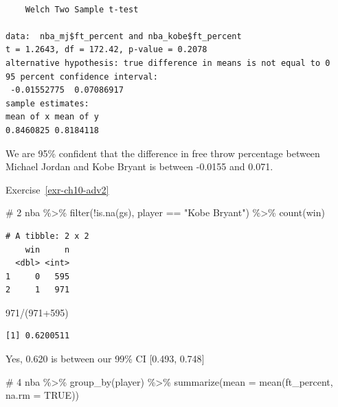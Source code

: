 \documentclass[
  letterpaper,
  DIV=11,
  numbers=noendperiod]{scrreprt}
\newenvironment{Shaded}{\begin{snugshade}}{\end{snugshade}}
\newcommand{\AttributeTok}[1]{\textcolor[rgb]{0.40,0.45,0.13}{#1}}
\newcommand{\CommentTok}[1]{\textcolor[rgb]{0.37,0.37,0.37}{#1}}
\newcommand{\ConstantTok}[1]{\textcolor[rgb]{0.56,0.35,0.01}{#1}}
\newcommand{\DecValTok}[1]{\textcolor[rgb]{0.68,0.00,0.00}{#1}}
\newcommand{\FunctionTok}[1]{\textcolor[rgb]{0.28,0.35,0.67}{#1}}
\newcommand{\NormalTok}[1]{\textcolor[rgb]{0.00,0.23,0.31}{#1}}
\newcommand{\SpecialCharTok}[1]{\textcolor[rgb]{0.37,0.37,0.37}{#1}}
\newcommand{\StringTok}[1]{\textcolor[rgb]{0.13,0.47,0.30}{#1}}
\theoremstyle{definition}
\theoremstyle{remark}
\begin{document}
\begin{verbatim}

    Welch Two Sample t-test

data:  nba_mj$ft_percent and nba_kobe$ft_percent
t = 1.2643, df = 172.42, p-value = 0.2078
alternative hypothesis: true difference in means is not equal to 0
95 percent confidence interval:
 -0.01552775  0.07086917
sample estimates:
mean of x mean of y 
0.8460825 0.8184118 
\end{verbatim}

We are 95\% confident that the difference in free throw percentage
between Michael Jordan and Kobe Bryant is between -0.0155 and 0.071.

Exercise~\ref{exr-ch10-adv2}

\begin{Shaded}
\begin{Highlighting}[]
\CommentTok{\# 2}
\NormalTok{nba }\SpecialCharTok{\%\textgreater{}\%} 
  \FunctionTok{filter}\NormalTok{(}\SpecialCharTok{!}\FunctionTok{is.na}\NormalTok{(gs), player }\SpecialCharTok{==} \StringTok{"Kobe Bryant"}\NormalTok{) }\SpecialCharTok{\%\textgreater{}\%} 
  \FunctionTok{count}\NormalTok{(win)}
\end{Highlighting}
\end{Shaded}

\begin{verbatim}
# A tibble: 2 x 2
    win     n
  <dbl> <int>
1     0   595
2     1   971
\end{verbatim}

\begin{Shaded}
\begin{Highlighting}[]
\DecValTok{971}\SpecialCharTok{/}\NormalTok{(}\DecValTok{971}\SpecialCharTok{+}\DecValTok{595}\NormalTok{)}
\end{Highlighting}
\end{Shaded}

\begin{verbatim}
[1] 0.6200511
\end{verbatim}

Yes, 0.620 is between our 99\% CI {[}0.493, 0.748{]}

\begin{Shaded}
\begin{Highlighting}[]
\CommentTok{\# 4}
\NormalTok{nba }\SpecialCharTok{\%\textgreater{}\%} 
  \FunctionTok{group\_by}\NormalTok{(player) }\SpecialCharTok{\%\textgreater{}\%} 
  \FunctionTok{summarize}\NormalTok{(}\AttributeTok{mean =} \FunctionTok{mean}\NormalTok{(ft\_percent, }\AttributeTok{na.rm =} \ConstantTok{TRUE}\NormalTok{))}
\end{Highlighting}
\end{Shaded}
\end{document}
